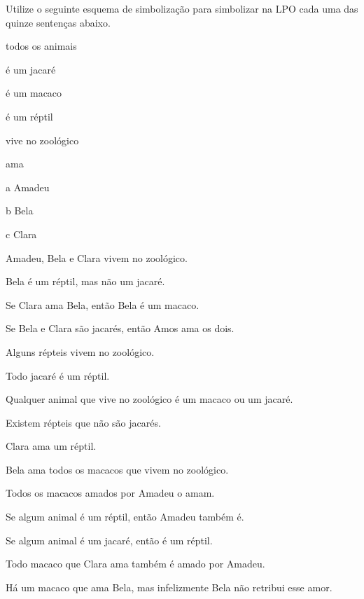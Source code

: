 \practiceproblems
\solutions
\problempart
Utilize o seguinte esquema de simbolização para simbolizar na LPO cada uma das quinze sentenças abaixo.
\begin{center}
\begin{ekey}
\item[\text{domínio}] todos os animais
\item[\atom{J}{x}]  é um jacaré
\item[\atom{M}{x}]  é um macaco
\item[\atom{R}{x}]  é um réptil
\item[\atom{Z}{x}]  vive no zoológico
\item[\atom{A}{x,y}]  ama 
\item[a] Amadeu
\item[b] Bela
\item[c] Clara
\end{ekey}
\end{center}
\begin{earg}
\item Amadeu, Bela e Clara vivem no zoológico.
\item Bela é um réptil, mas não um jacaré.
\item Se Clara ama Bela, então Bela é um macaco.
\item Se Bela e Clara são jacarés, então Amos ama os dois.
\item Alguns répteis vivem no zoológico.
\item Todo jacaré é um réptil.
\item Qualquer animal que vive no zoológico é um macaco ou um jacaré.
\item Existem répteis que não são jacarés.
\item Clara ama um réptil.
\item Bela ama todos os macacos que vivem no zoológico.
\item Todos os macacos amados por Amadeu o amam.
\item Se algum animal é um réptil, então Amadeu também é.
\item Se algum animal é um jacaré, então é um réptil.
\item Todo macaco que Clara ama também é amado por Amadeu.
\item Há um macaco que ama Bela, mas infelizmente Bela não retribui esse amor.
\end{earg}

